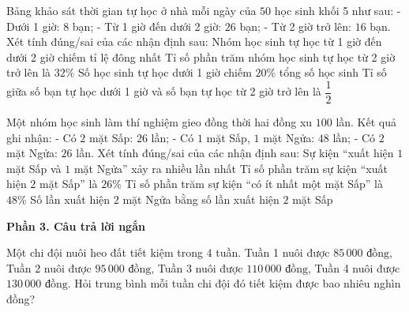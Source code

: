 \begin{ex} %
Bảng khảo sát thời gian tự học ở nhà mỗi ngày của $50$ học sinh khối 5 như sau:
- Dưới 1 giờ: $8$ bạn;
- Từ 1 giờ đến dưới 2 giờ: $26$ bạn;
- Từ 2 giờ trở lên: $16$ bạn.
Xét tính đúng/sai của các nhận định sau:
\choiceTF
{\True Nhóm học sinh tự học từ 1 giờ đến dưới 2 giờ chiếm tỉ lệ đông nhất}
{\True Tỉ số phần trăm nhóm học sinh tự học từ 2 giờ trở lên là $32\%$}
{Số học sinh tự học dưới 1 giờ chiếm $20\%$ tổng số học sinh}
{\True Tỉ số giữa số bạn tự học dưới 1 giờ và số bạn tự học từ 2 giờ trở lên là $\dfrac{1}{2}$}
\end{ex}

\begin{ex} %
Một nhóm học sinh làm thí nghiệm gieo đồng thời hai đồng xu $100$ lần. Kết quả ghi nhận:
- Có $2$ mặt Sấp: $26$ lần;
- Có $1$ mặt Sấp, $1$ mặt Ngửa: $48$ lần;
- Có $2$ mặt Ngửa: $26$ lần.
Xét tính đúng/sai của các nhận định sau:
\choiceTF
{\True Sự kiện “xuất hiện $1$ mặt Sấp và $1$ mặt Ngửa” xảy ra nhiều lần nhất}
{\True Tỉ số phần trăm sự kiện “xuất hiện $2$ mặt Sấp” là $26\%$}
{Tỉ số phần trăm sự kiện “có ít nhất một mặt Sấp” là $48\%$}
{\True Số lần xuất hiện $2$ mặt Ngửa bằng số lần xuất hiện $2$ mặt Sấp}
\end{ex}

\textbf{Phần 3. Câu trả lời ngắn}

\begin{ex} %
Một chi đội nuôi heo đất tiết kiệm trong $4$ tuần. Tuần 1 nuôi được $85\,000\text{ đồng}$, Tuần 2 nuôi được $95\,000\text{ đồng}$, Tuần 3 nuôi được $110\,000\text{ đồng}$, Tuần 4 nuôi được $130\,000\text{ đồng}$. Hỏi trung bình mỗi tuần chi đội đó tiết kiệm được bao nhiêu nghìn đồng?
\end{ex}

